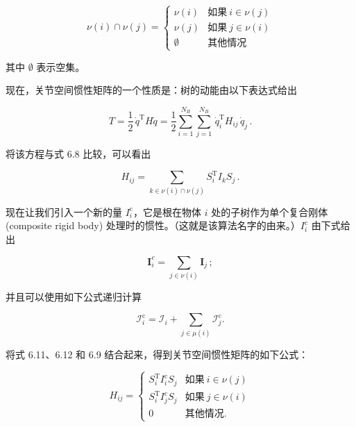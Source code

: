 \documentclass[10pt,a4paper]{book}
\theoremstyle{thmstyle} %
\theoremstyle{defstyle} %
\theoremstyle{prostyle} %
\begin{document}
$$
\nu ( i ) ∩ \nu ( j ) = \left\{ \begin{array}{ll} { \nu ( i ) } & { \text{如果}~ i \in \nu ( j ) } \\{ \nu ( j ) } & { \text{如果}~ j \in \nu ( i ) } \\{ \emptyset } & { \text{其他情况} } \end{array} \right.
$$



其中 $\emptyset$ 表示空集。



现在，关节空间惯性矩阵的一个性质是：树的动能由以下表达式给出



$$
T = \frac { 1 } { 2 } \, \dot { q } ^{\mathrm { T} } H \dot { q } = \frac { 1 } { 2 } \sum _ { i = 1 } ^{N _ { B} } \sum _ { j = 1 } ^{N _ { B} } \, \dot { q } _ { i } ^{\mathrm { T} } H _ { i j } \, \dot { q } _ { j } \, .
$$



将该方程与式 6.8 比较，可以看出



$$
H _ { i j } = \sum _ { k \in \nu ( i ) \cap \nu ( j ) } S _ { i } ^{\mathrm { T} } I _ { k } S _ { j } \, .
$$



现在让我们引入一个新的量 $I_{i}^{\mathrm{c}}$，它是根在物体 $i$ 处的子树作为单个复合刚体 (composite rigid body) 处理时的惯性。（这就是该算法名字的由来。）$I_{i}^{\mathrm{c}}$ 由下式给出



$$
{ \boldsymbol { I } } _ { i } ^{c} = \sum _ { j \in \nu ( i ) } { \boldsymbol { I } } _ { j } \, ;
$$



并且可以使用如下公式递归计算



$$
{ \mathcal I } _ { i } ^{\mathrm { c} } = { \mathcal I } _ { i } + \sum _ { j \in \mu ( i ) } { \mathcal I } _ { j } ^{\mathrm { c} } .
$$



将式 6.11、6.12 和 6.9 结合起来，得到关节空间惯性矩阵的如下公式：



$$
H _ { i j } = \left\{ \begin{array}{ll} { S _ { i } ^{\mathrm { T} } I _ { i } ^{\mathrm { c} } S _ { j } } & { \text{如果}~ i \in \nu ( j ) } \\{ S _ { i } ^{\mathrm { T} } I _ { j } ^{\mathrm { c} } S _ { j } } & { \text{如果}~ j \in \nu ( i ) } \\{ 0 } & \text{其他情况} . \end{array} \right.
$$
\end{document}
